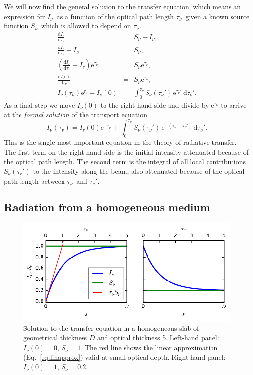 \documentclass[12pt]{article}
\numberwithin{equation}{section}
\def\exp{\mathrm{e}}
\def\dd{\mathrm{d}}
\def\Inu{\ensuremath{I_{\nu}}}
\def\Snu{\ensuremath{S_{\nu}}}
\def\taunu{\ensuremath{\tau_{\nu}}}
\newcommand{\be}{\begin{equation}}
\newcommand{\ee}{\end{equation}}
\newcommand{\bea}{\begin{eqnarray}}
\newcommand{\eea}{\end{eqnarray}}
\begin{document}
We will now find the general solution to the transfer equation, which means an expression for \Inu\ as a function of the optical path length \taunu\ given a known source function \Snu\ which is allowed to depend on \taunu.
\bea
\frac{\dd \Inu}{\dd \taunu} &=& \Snu -\Inu, \nonumber \\
\frac{\dd \Inu}{\dd \taunu} +\Inu &=& \Snu,  \nonumber  \\
\left( \frac{\dd \Inu}{\dd \taunu} +\Inu \right) \exp^{\taunu} &=& \Snu \exp^{\taunu},  \nonumber  \\
\frac{\dd \Inu  \exp^{\taunu}}{\dd \taunu}  &=& \Snu \exp^{\taunu}  \nonumber,  \\
\Inu(\taunu)  \exp^{\taunu}  - \Inu(0) &=& \int_0^{\taunu} \Snu(\taunu') \, \exp^{\taunu'}  \, \dd \taunu'.
\eea
As a final step we move $\Inu(0)$ to the right-hand side and divide by $\exp^{\taunu}$ to arrive at the {\it formal solution} of the transport equation:
\be
\Inu(\taunu)  = \Inu(0)  \exp^{-\taunu}  +  \int_0^{\taunu} \Snu(\taunu') \, \exp^{-(\taunu-\taunu')}  \, \dd \taunu'.
\label{eq:formal-solution}
\ee
This is the single most important equation in the theory of radiative transfer. The first term on the right-hand side is the initial intensity attenuated because of the optical path length. The second term is the integral of all local contributions $\Snu(\taunu')$ to the intensity along the beam, also attenuated because of the optical path length between \taunu\ and $\taunu'$.

\subsection{Radiation from a homogeneous medium}

\begin{figure}
  \centering
 \includegraphics[width=14cm]{figs/homogeneous_slab}
  \caption{Solution to the transfer equation in a homogeneous slab of geometrical thickness $D$ and optical thickness 5. Left-hand panel: $ \Inu(0) = 0$, $\Snu = 1$. The red line shows the linear approximation (Eq.~\ref{eq:linapprox}) valid at small optical depth. Right-hand panel: $ \Inu(0) = 1$, $\Snu = 0.2$.
  \label{fig:homogeneous_slab}}
\end{figure}
\end{document}

